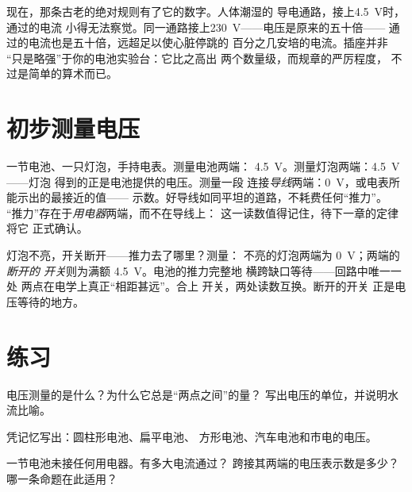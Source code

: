 \begin{remark}[为何 230 V 会致命]\label{rem:g8:voltage-voltmeter:mains}
现在，那条古老的绝对规则有了它的数字。人体潮湿的
导电通路，接上\qty{4.5}{V}时，通过的电流
小得无法察觉。同一通路接上\qty{230}{V}——电压是原来的五十倍——
通过的电流也是五十倍，远超足以使心脏停跳的
百分之几安培的电流。插座并非
“只是略强”于你的电池实验台：它比之高出
两个数量级，而规章的严厉程度，
不过是简单的算术而已。
\end{remark}

\section{初步测量电压}

\begin{example}[绕简单回路一周]\label{ex:g8:voltage-voltmeter:readings}
一节电池、一只灯泡，手持电表。测量电池两端：
\qty{4.5}{V}。测量灯泡两端：\qty{4.5}{V}——灯泡
得到的正是电池提供的电压。测量一段
连接\emph{导线}两端：\qty{0}{V}，或电表所能示出的最接近的值——
示数。好导线如同平坦的道路，不耗费任何“推力”。
“推力”存在于\emph{用电器}两端，而不在导线上：
这一读数值得记住，待下一章的定律将它
正式确认。
\end{example}

\begin{example}[断开开关的“供认”]\label{ex:g8:voltage-voltmeter:openswitch}
灯泡不亮，开关断开——推力去了哪里？测量：
不亮的灯泡两端为 \qty{0}{V}；两端的\emph{断开的
开关}则为满额 \qty{4.5}{V}。电池的推力完整地
横跨缺口等待——回路中唯一一处
两点在电学上真正“相距甚远”。合上
开关，两处读数互换。断开的开关
正是电压等待的地方。
\end{example}

\section{练习}

\begin{exercise}[$\star$]\label{exo:g8:voltage-voltmeter:1}
电压测量的是什么？为什么它总是“两点之间”的量？
写出电压的单位，并说明水流比喻。
\end{exercise}

\begin{exercise}[$\star$]\label{exo:g8:voltage-voltmeter:2}
凭记忆写出：圆柱形电池、扁平电池、
方形电池、汽车电池和市电的电压。
\end{exercise}

\begin{exercise}[$\star$]\label{exo:g8:voltage-voltmeter:3}
一节电池未接任何用电器。有多大电流通过？
跨接其两端的电压表示数是多少？哪一条命题在此适用？
\end{exercise}

